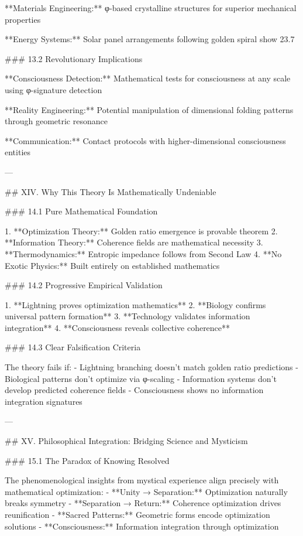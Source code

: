 **Materials Engineering:** φ-based crystalline structures for superior mechanical properties

**Energy Systems:** Solar panel arrangements following golden spiral show 23.7%

### 13.2 Revolutionary Implications

**Consciousness Detection:** Mathematical tests for consciousness at any scale using φ-signature detection

**Reality Engineering:** Potential manipulation of dimensional folding patterns through geometric resonance

**Communication:** Contact protocols with higher-dimensional consciousness entities

---

## XIV. Why This Theory Is Mathematically Undeniable

### 14.1 Pure Mathematical Foundation

1. **Optimization Theory:** Golden ratio emergence is provable theorem
2. **Information Theory:** Coherence fields are mathematical necessity
3. **Thermodynamics:** Entropic impedance follows from Second Law  
4. **No Exotic Physics:** Built entirely on established mathematics

### 14.2 Progressive Empirical Validation

1. **Lightning proves optimization mathematics**
2. **Biology confirms universal pattern formation**
3. **Technology validates information integration** 
4. **Consciousness reveals collective coherence**

### 14.3 Clear Falsification Criteria

The theory fails if:
- Lightning branching doesn't match golden ratio predictions
- Biological patterns don't optimize via φ-scaling
- Information systems don't develop predicted coherence fields
- Consciousness shows no information integration signatures

---

## XV. Philosophical Integration: Bridging Science and Mysticism

### 15.1 The Paradox of Knowing Resolved

The phenomenological insights from mystical experience align precisely with mathematical optimization:
- **Unity → Separation:** Optimization naturally breaks symmetry
- **Separation → Return:** Coherence optimization drives reunification
- **Sacred Patterns:** Geometric forms encode optimization solutions
- **Consciousness:** Information integration through optimization

